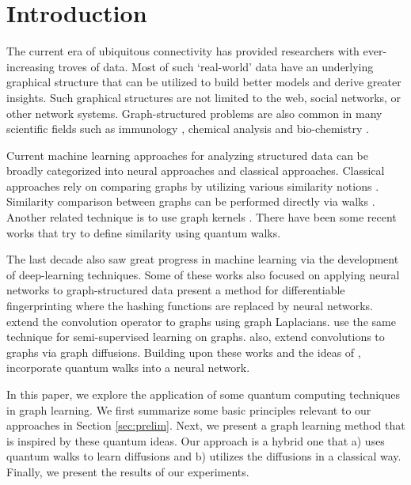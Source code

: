 \documentclass{article}
\begin{document}
\section{Introduction}
The current era of ubiquitous connectivity has provided researchers with ever-increasing troves of data. Most of such ‘real-world’ data have an underlying graphical structure that can be utilized to build better models and derive greater insights. %
Such graphical structures are not limited to the web, social networks, or other network systems. Graph-structured problems are also common in many scientific fields such as immunology \citep{Crossman2020}, chemical analysis \citep{PCSJohn2019} and bio-chemistry \citep{bonetta2019}.   


Current machine learning approaches for analyzing structured data can be broadly categorized into neural approaches and classical approaches. Classical approaches rely on comparing graphs by utilizing various similarity notions \cite{kondor09_graphlet,kondor08_spectrum}. Similarity comparison between graphs can be performed directly via walks \citep{dobson03_enzyme,callut_dsicriminativewalk}. Another related technique is to use graph kernels \citep{JMLR:v11:vishwanathan10a,gartner03_graphhard}. There have been some recent works \citep{bai17_qkernel} that try to define similarity using quantum walks. 

The last decade also saw great progress in machine learning via the development of deep-learning techniques. Some of these works also focused on applying neural networks to graph-structured data \citep{Defferrard2016ConvolutionalNN,NIPS2015_5954} 
\citet{NIPS2015_5954} present a method for differentiable fingerprinting where the hashing functions are replaced by neural networks. \citet{Defferrard2016ConvolutionalNN} extend the convolution operator to graphs using graph Laplacians. \cite{Kipf2017SemiSupervisedCW} use the same technique for semi-supervised learning on graphs.
\cite{Atwood2016DiffusionConvolutionalNN} also, extend convolutions to graphs via graph diffusions. Building upon these works and the ideas of \citet{bai17_qkernel}, \citet{Dernbach19_qwnn} incorporate quantum walks into a neural network.



In this paper, we explore the application of some quantum computing techniques in graph learning. We first summarize some basic principles relevant to our approaches in Section \ref{sec:prelim}. Next, we present a graph learning method that is inspired by these quantum ideas. Our approach is a hybrid one that a) uses quantum walks to learn diffusions  and b) utilizes the diffusions in a classical way. Finally, we present the results of our experiments.
\end{document}
